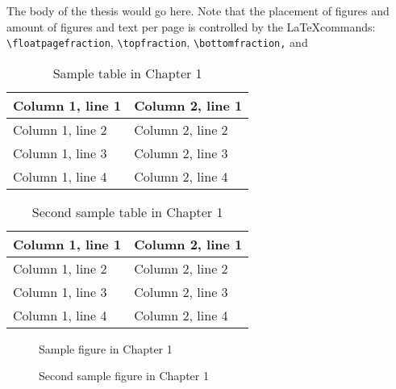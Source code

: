 \documentclass[dvips,11pt,oneside]{report}
\begin{document}
The body of the thesis would go here.  Note that the placement of figures and
amount of figures and text per page is controlled by the \LaTeX commands:
\verb+\floatpagefraction+, \verb+\topfraction+, \verb+\bottomfraction,+ and 

\begin{table} \caption{Sample table in Chapter 1} \begin{center}
\begin{tabular}{|l|l|} \hline
Column 1, line 1 & Column 2, line 1 \\ \hline
Column 1, line 2 & Column 2, line 2 \\ \hline
Column 1, line 3 & Column 2, line 3 \\ \hline
Column 1, line 4 & Column 2, line 4 \\ \hline
\end{tabular} \end{center} \end{table}

\begin{table} \caption{Second sample table in Chapter 1} \begin{center}
\begin{tabular}{|l|l|} \hline
Column 1, line 1 & Column 2, line 1 \\ \hline
Column 1, line 2 & Column 2, line 2 \\ \hline
Column 1, line 3 & Column 2, line 3 \\ \hline
Column 1, line 4 & Column 2, line 4 \\ \hline
\end{tabular} \end{center} \end{table}

\begin{figure} \caption{Sample figure in Chapter 1} \begin{center}
\end{center} \end{figure}

\begin{figure} \caption{Second sample figure in Chapter 1} \begin{center}
\end{center} \end{figure}
\end{document}
